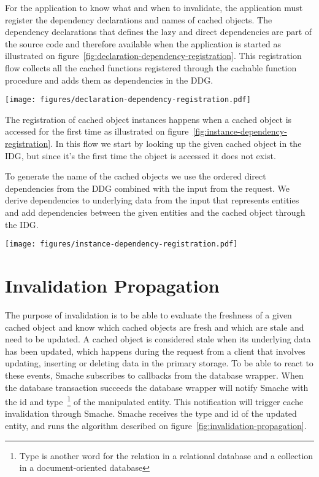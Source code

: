 For the application to know what and when to invalidate, the application must register the dependency declarations and names of cached objects. The dependency declarations that defines the lazy and direct dependencies are part of the source code and therefore available when the application is started as illustrated on figure~\ref{fig:declaration-dependency-registration}. This registration flow collects all the cached functions registered through the cachable function procedure and adds them as dependencies in the DDG.

\begin{figure*}[ht!]
  \centering
  \texttt{[image: figures/declaration-dependency-registration.pdf]}
  \caption{The flow in which lazy and direct dependencies are registered from the declarations}
  \label{fig:declaration-dependency-registration}
\end{figure*}

The registration of cached object instances happens when a cached object is accessed for the first time as illustrated on figure~\ref{fig:instance-dependency-registration}. In this flow we start by looking up the given cached object in the IDG, but since it's the first time the object is accessed it does not exist.

To generate the name of the cached objects we use the ordered direct dependencies from the DDG combined with the input from the request. We derive dependencies to underlying data from the input that represents entities and add dependencies between the given entities and the cached object through the IDG.

\begin{figure*}[ht!]
  \centering
  \texttt{[image: figures/instance-dependency-registration.pdf]}
  \caption{The flow in which cached object instances are accessed when they are accessed the first time}
  \label{fig:instance-dependency-registration}
\end{figure*}

\section{Invalidation Propagation}
\label{sec:invalidation-propagation}

The purpose of invalidation is to be able to evaluate the freshness of a given cached object and know which cached objects are fresh and which are stale and need to be updated. A cached object is considered stale when its underlying data has been updated, which happens during the request from a client that involves updating, inserting or deleting data in the primary storage. To be able to react to these events, Smache subscribes to callbacks from the database wrapper. When the database transaction succeeds the database wrapper will notify Smache with the id and type~\footnote{Type is another word for the relation in a relational database and a collection in a document-oriented database} of the manipulated entity. This notification will trigger cache invalidation through Smache. Smache receives the type and id of the updated entity, and runs the algorithm described on figure~\ref{fig:invalidation-propagation}.

